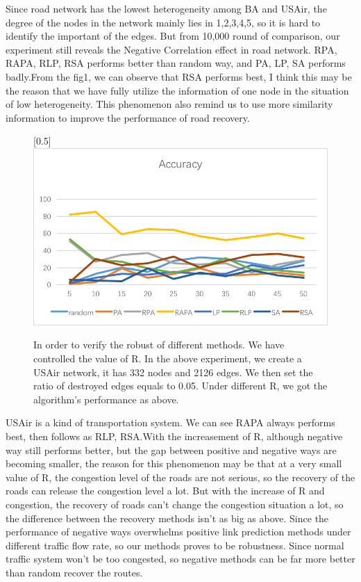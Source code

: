 \documentclass[onecolumn,preprintnumbers,amsmath,amssymb]{revtex4}
\begin{document}
Since road network has the lowest heterogeneity among BA and USAir, the degree of the nodes in the network mainly lies in 1,2,3,4,5, so it is hard to identify the important of the edges. But from 10,000 round of comparison, our experiment still reveals the Negative Correlation effect in road network. RPA, RAPA, RLP, RSA performs better than random way, and PA, LP, SA performs badly.From the fig1, we can observe that RSA performs best, I think this may be the reason that we have fully utilize the information of one node in the situation of low heterogeneity. This phenomenon also remind us to use more similarity information to improve the performance of road recovery. 


\begin{figure}[ht]
\scalebox{0.5}[0.5]{\includegraphics[trim=0 10 0 0]{baFlow.png}}
\caption{In order to verify  the robust of different methods. We have controlled the value of R. In the above experiment, we create a USAir network, it has 332 nodes and 2126 edges. We then set the ratio of destroyed edges equals to 0.05. Under different R, we got the algorithm's performance as above.}\label{BAZD}
\end{figure}


USAir is a kind of transportation system. We can see RAPA always performs best, then follows as RLP, RSA.With the increasement of R, although negative way still performs better, but the gap between positive and negative ways are becoming smaller, the reason for this phenomenon may be that at a very small value of R, the congestion  level of the roads are not serious, so the recovery of the roads can release the congestion  level a lot. But with the increase of R and congestion, the recovery of roads can't change the congestion  situation a lot, so the difference between the recovery methods isn't as big as above. Since the performance of negative ways overwhelms positive link prediction methods under different traffic flow rate, so our methods proves to be robustness. Since normal traffic system won't be too congested, so negative methods can be far more better than random recover the routes. 
\end{document}

